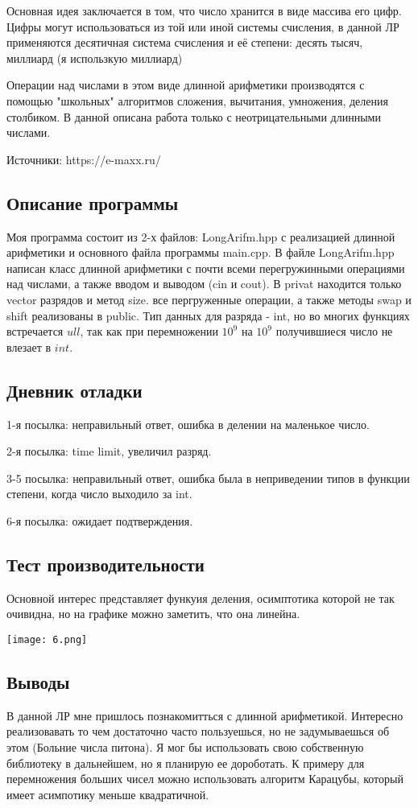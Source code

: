 \documentclass[12pt]{article}
\begin{document}
Основная идея заключается в том, что число хранится в виде массива его цифр.
Цифры могут использоваться из той или иной системы счисления, в данной ЛР применяются десятичная система счисления и её степени: десять тысяч, миллиард (я использкую миллиард)

Операции над числами в этом виде длинной арифметики производятся с помощью "школьных" алгоритмов сложения, вычитания, умножения, деления столбиком. В данной описана работа только с неотрицательными длинными числами.


Источники: https://e-maxx.ru/

\subsection*{Описание программы}

Моя программа состоит из 2-х файлов: LongArifm.hpp с реализацией длинной арифметики и основного файла программы main.cpp. В файле LongArifm.hpp написан класс длинной арифметики с почти всеми перегружинными операциями над числами, а также вводом и выводом (cin и cout). В privat находится только vector разрядов и метод size. все пергруженные операции, а также методы swap и shift реализованы в public. Тип данных для разряда - int, но во многих функциях встречается $ull$, так как при перемножении $10^9$ на $10^9$ получившиеся число не влезает в $int$.

\subsection*{Дневник отладки}

1-я посылка: неправильный ответ, ошибка в делении на маленькое число.

2-я посылка: time limit, увеличил разряд.
 
3-5 посылка: неправильный ответ, ошибка была в неприведении типов в функции степени, когда число выходило за int.

6-я посылка: ожидает подтверждения.

\subsection*{Тест производительности}
Основной интерес представляет функуия деления, осимптотика которой не так очивидна, но на графике можно заметить, что она линейна.

\texttt{[image: 6.png]}

\subsection*{Выводы}

В данной ЛР мне пришлось познакомитться с длинной арифметикой. Интересно реализовавать то чем достаточно часто пользуешься, но не задумываешься об этом (Больние числа питона). Я мог бы использовать свою собственную библиотеку в дальнейшем, но я планирую ее дороботать. К примеру для перемножения больших чисел можно использовать алгоритм Карацубы, который имеет асимпотику меньше квадратичной.
\end{document}
